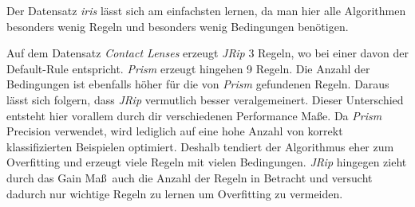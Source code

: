 Der Datensatz \emph{iris} l\"asst sich am einfachsten lernen, da man hier alle Algorithmen besonders wenig Regeln und besonders wenig Bedingungen ben\"otigen.

Auf dem Datensatz \emph{Contact Lenses} erzeugt \emph{JRip} 3 Regeln, wo bei einer davon der Default-Rule entspricht. \emph{Prism} erzeugt hingehen 9 Regeln. Die Anzahl der Bedingungen ist ebenfalls h\"oher f\"ur die von \emph{Prism} gefundenen Regeln. Daraus l\"asst sich folgern, dass \emph{JRip} vermutlich besser veralgemeinert. 
Dieser Unterschied entsteht hier vorallem durch dir verschiedenen Performance Ma\ss e. Da \emph{Prism} Precision verwendet, wird lediglich auf eine hohe Anzahl von korrekt klassifizierten Beispielen optimiert. Deshalb tendiert der Algorithmus eher zum Overfitting und erzeugt viele Regeln mit vielen Bedingungen. \emph{JRip} hingegen zieht durch das Gain Ma\ss\  auch die Anzahl der Regeln in Betracht und versucht dadurch nur wichtige Regeln zu lernen um Overfitting zu vermeiden.
